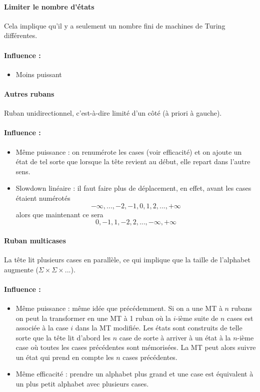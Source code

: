 \paragraph{Limiter le nombre d'états} Cela implique qu'il y a seulement un nombre fini de machines de Turing différentes.

\paragraph{Influence :}
\begin{itemize}
	\item Moins puissant
\end{itemize}

\paragraph{Autres rubans}

Ruban unidirectionnel, c'est-à-dire limité d'un côté (à priori à gauche).

\paragraph{Influence :}
\begin{itemize}
	\item Même puissance : on renumérote les cases (voir efficacité) et on ajoute un état de tel sorte que lorsque la tête revient au début, elle repart dans l'autre sens.
	\item Slowdown linéaire : il faut faire plus de déplacement, en
		effet, avant les cases étaient numérotés
		$$-\infty,...,-2,-1,0,1,2,...,+\infty$$
		alors que maintenant ce sera
	    $$0,-1,1,-2,2,...,-\infty,+\infty$$
\end{itemize}

\paragraph{Ruban multicases} La tête lit plusieurs cases en parallèle, ce qui
implique que la taille de l'alphabet augmente ($\Sigma \times \Sigma \times ...$).

\paragraph{Influence :}
\begin{itemize}
	\item Même puissance : même idée que précédemment. Si on a une MT à $n$ rubans on peut la transformer en une MT à 1 ruban où la $i$-ième suite de $n$ cases est associée à la case $i$ dans la MT modifiée. Les états sont construits de telle sorte que la tête lit d'abord les $n$ case de sorte à arriver à un état à la $n$-ième case où toutes les cases précédentes sont mémorisées. La MT peut alors suivre un état qui prend en compte les $n$ cases précédentes.
	\item Même efficacité : prendre un alphabet plus grand et une case est équivalent à un plus petit alphabet avec plusieurs cases.
\end{itemize}

